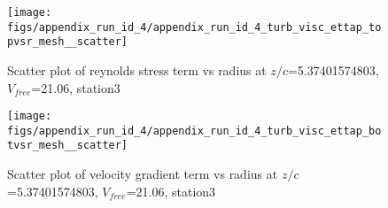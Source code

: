 \begin{figure}[H]
\centering
\texttt{[image: figs/appendix\_run\_id\_4/appendix\_run\_id\_4\_turb\_visc\_ettap\_topvsr\_mesh\_\_scatter]}
\caption{Scatter plot of reynolds stress term vs radius at $z/c$=5.37401574803, $V_{free}$=21.06, station3}
\label{fig:appendix_run_id_4_turb_visc_ettap_topvsr_mesh__scatter}
\end{figure}


\begin{figure}[H]
\centering
\texttt{[image: figs/appendix\_run\_id\_4/appendix\_run\_id\_4\_turb\_visc\_ettap\_botvsr\_mesh\_\_scatter]}
\caption{Scatter plot of velocity gradient term vs radius at $z/c$=5.37401574803, $V_{free}$=21.06, station3}
\label{fig:appendix_run_id_4_turb_visc_ettap_botvsr_mesh__scatter}
\end{figure}


